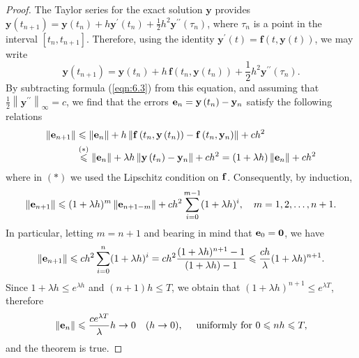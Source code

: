 \documentclass[a4paper]{article}
\begin{document}
\begin{proof}
    The Taylor series for the exact solution $\mathbf{y}$ provides $\mathbf{y}\left(t_{n+1}\right)=\mathbf{y}\left(t_n\right)+h \mathbf{y}^{\prime}\left(t_n\right)+\frac{1}{2} h^2 \mathbf{y}^{\prime \prime}\left(\tau_n\right)$, where $\tau_n$ is a point in the interval $\left[t_n, t_{n+1}\right]$. Therefore, using the identity $\mathbf{y}^{\prime}(t)=\mathbf{f}(t, \mathbf{y}(t))$, we may write
\begin{equation}\label{eqn:6.5}
    \mathbf{y}\left(t_{n+1}\right)=\mathbf{y}\left(t_n\right)+h\, \mathbf{f}(t_n, \mathbf{y}(t_n))+\frac{1}{2} h^2 \mathbf{y}^{\prime \prime}\left(\tau_n\right) .
\end{equation}
By subtracting formula (\ref{eqn:6.3}) from this equation, and assuming that $\frac{1}{2}\left\|\mathbf{y}^{\prime \prime}\right\|_{\infty}=c$, we find that the errors ${\bf e}_n=\mathbf{y}\left(t_n\right)-\mathbf{y}_n$ satisfy the following relations
\begin{align*}
    \left\|{\bf e}_{n+1}\right\| & \leqslant\left\|{\bf e}_n\right\|+h\left\|\mathbf{f}\left(t_n, \mathbf{y}\left(t_n\right)\right)-\mathbf{f}\left(t_n, \mathbf{y}_n\right)\right\|+c h^2 \\
    & \stackrel{(*)}{\leqslant}\left\|\mathbf{e}_n\right\|+\lambda h\left\|\mathbf{y}\left(t_n\right)-\mathbf{y}_n\right\|+c h^2=(1+\lambda h)\left\|\mathbf{e}_n\right\|+c h^2
\end{align*}
where in $(*)$ we used the Lipschitz condition on ${\bf f}$. Consequently, by induction,
\[
\left\|{\bf e}_{n+1}\right\| \leqslant(1+\lambda h)^m\left\|{\bf e}_{n+1-m}\right\|+c h^2 \sum_{i=0}^{m-1}(1+\lambda h)^i, \quad m=1,2, \ldots, n+1 .
\]
In particular, letting $m=n+1$ and bearing in mind that ${\bf e}_0= \mathbf{0} $, we have
\[
\left\|{\bf e}_{n+1}\right\| \leqslant c h^2 \sum_{i=0}^n(1+\lambda h)^i=c h^2 \frac{(1+\lambda h)^{n+1}-1}{(1+\lambda h)-1} \leqslant \frac{c h}{\lambda}(1+\lambda h)^{n+1} .
\]
Since $1+\lambda h \leq {e}^{\lambda h}$ and $(n+1) h \leq T$, we obtain that $(1+\lambda h)^{n+1} \leq {e}^{\lambda T}$, therefore
\[
\left\|{\bf e}_n\right\| \leqslant \frac{c e^{\lambda T}}{\lambda} h \rightarrow 0 \quad(h \rightarrow 0), \quad \text { uniformly for } 0 \leqslant n h \leqslant T,
\]
and the theorem is true.
\end{proof}
\end{document}

